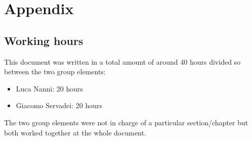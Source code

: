 \chapter{Appendix}



\section{Working hours}
This document was written in a total amount of around 40 hours divided so between the two group elements:
\begin{itemize}
\item Luca Nanni: 20 hours
\item Giacomo Servadei: 20 hours
\end{itemize}
The two group elements were not in charge of a particular section/chapter but both worked together at the whole document.